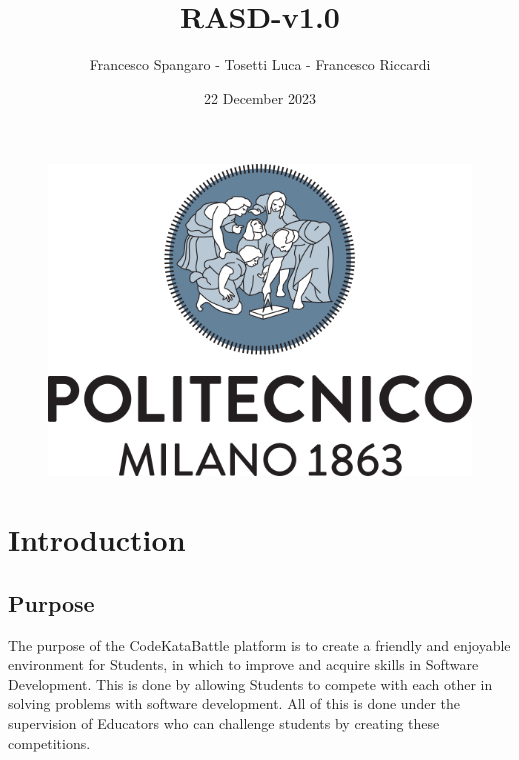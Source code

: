 \documentclass{article}
\title{RASD-v1.0}
\author{Francesco Spangaro - Tosetti Luca - Francesco Riccardi}
\date{22 December 2023}
\begin{document}
\maketitle

\begin{figure}[h]
    \centering
    \includegraphics[scale=0.5]{politecnico-di-milano-logo.png}
\end{figure}



\tableofcontents

\newpage

\pagestyle{IntroductionStyle}

\section{Introduction}
\subsection{Purpose}
The purpose of the CodeKataBattle platform is to create a friendly and enjoyable environment for Students, in which
to improve and acquire skills in Software Development. 
This is done by allowing Students to compete with each other in solving problems with software development.
All of this is done under the supervision of Educators who can challenge students by creating these competitions.
\end{document}
